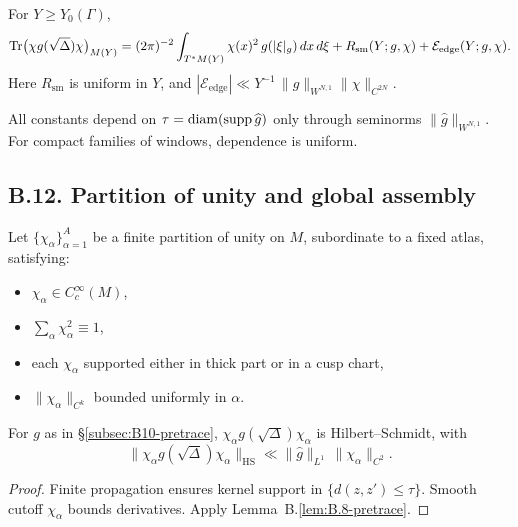 \begin{corollary}
\label{cor:B-sharptrace}
For $Y\ge Y_0(\Gamma)$,
\[
\operatorname{Tr}\!\big(\chi g(\sqrt\Delta)\chi\big)_{M(Y)}
=(2\pi)^{-2}\int_{T^*M(Y)}\chi(x)^2\,g(|\xi|_g)\,dx\,d\xi
+R_{\mathrm{sm}}(Y;g,\chi)+\mathcal E_{\mathrm{edge}}(Y;g,\chi).
\]
Here $R_{\mathrm{sm}}$ is uniform in $Y$, and
$|\mathcal E_{\mathrm{edge}}|\ll Y^{-1}\,\|\widehat g\|_{W^{N,1}}\|\chi\|_{C^{2N}}$.
\end{corollary}

\begin{remark}
\label{rmk:B-width}
All constants depend on $\tau=\operatorname{diam}(\operatorname{supp}\widehat g)$ only through seminorms
$\|\widehat g\|_{W^{N,1}}$. For compact families of windows, dependence is uniform.
\end{remark}

\subsection*{B.12. Partition of unity and global assembly}
\label{subsec:B12-partition}

Let $\{\chi_\alpha\}_{\alpha=1}^A$ be a finite partition of unity on $M$, subordinate to
a fixed atlas, satisfying:
\begin{itemize}
  \item $\chi_\alpha\in C_c^\infty(M)$,
  \item $\sum_\alpha \chi_\alpha^2\equiv 1$,
  \item each $\chi_\alpha$ supported either in thick part or in a cusp chart,
  \item $\|\chi_\alpha\|_{C^k}$ bounded uniformly in $\alpha$.
\end{itemize}

\begin{lemma}
\label{lem:B-HSloc}
For $g$ as in \S\ref{subsec:B10-pretrace},
$\chi_\alpha g(\sqrt\Delta)\chi_\alpha$ is Hilbert–Schmidt, with
\[
\|\chi_\alpha g(\sqrt\Delta)\chi_\alpha\|_{\mathrm{HS}}
\ll \|\widehat g\|_{L^1}\,\|\chi_\alpha\|_{C^2}.
\]
\end{lemma}

\begin{proof}
Finite propagation ensures kernel support in $\{d(z,z')\le\tau\}$.
Smooth cutoff $\chi_\alpha$ bounds derivatives. Apply Lemma~B.\ref{lem:B.8-pretrace}.
\end{proof}

